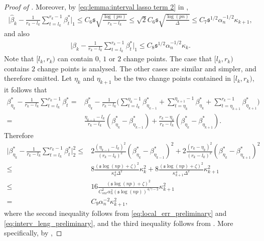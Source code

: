 \documentclass[11pt]{article}
\newcommand{\s}{ { \mathfrak{s}  } }
\theoremstyle{plain}
\theoremstyle{definition}
\begin{document}
\begin{proof}[Proof of ]
Moreover, by \eqref{eq:lemma:interval lasso term 2} in ,
\begin{align}\label{eq:lasso_err_preliminary_l1_1}
    \bigg| \widehat \beta_k - \frac{1}{r_k-l_k}\sum_{t = l_k}^{r_k-1}\beta_t^* \bigg|_1 \leq C_6\s\sqrt{\frac{\log(pn)}{r_k-l_k}} \leq \sqrt{2}C_6\s\sqrt{\frac{\log(pn)}{\Delta}} \leq C_7\s^{1/2}\alpha_n^{-1/2}\kappa_{k+1},
\end{align}
and also
\begin{align}\label{eq:lasso_err_preliminary_l1_3}
    \bigg| \widehat \beta_k - \frac{1}{r_k-l_k}\sum_{t = l_k}^{r_k-1}\beta_t^* \bigg|_1 \leq C_8\s^{1/2}\alpha_n^{-1/2}\kappa_{k}.
\end{align}
Note that $[l_k,r_k)$ can contain $0$, $1$ or $2$ change points. The case that $[l_k, r_k)$ contains $2$ change points is analysed. The other cases are similar and simpler, and therefore omitted. Let $\eta_{k}$ and $\eta_{k+1}$ be the two change points contained in $[l_k,r_k)$, it follows that
\begin{align*}
    \beta_{\eta_k}^* - \frac{1}{r_k-l_k}\sum_{t = l_k}^{r_k-1}\beta_t^* =&  \beta_{\eta_k}^* - \frac{1}{r_k-l_k}\bigg(\sum_{t = l_k}^{\eta_{k}-1}\beta_{\eta_{k-1}}^* + \sum_{t = \eta_{k}}^{\eta_{k+1}-1}\beta_{\eta_{k}}^* + \sum_{t = \eta_{k+1}}^{r_k-1}\beta_{\eta_{k+1}}^*\bigg)\\
    =& \frac{\eta_{k-1}-l_k}{r_k-l_k}(\beta_{\eta_{k}}^* - \beta_{\eta_{k-1}}^*) + \frac{r_k-\eta_k}{r_k-l_k}(\beta_{\eta_{k}}^* - \beta_{\eta_{k+1}}^*).
\end{align*}
Therefore
\begin{align}\label{eq:lasso_err_preliminary_2}
    \bigg|\beta_{\eta_k}^* - \frac{1}{r_k-l_k}\sum_{t = l_k}^{r_k-1}\beta_t^*\bigg|_2^2 
    \leq& 2\frac{(\eta_{k-1}-l_k)^2}{(r_k-l_k)^2}(\beta_{\eta_{k}}^* - \beta_{\eta_{k-1}}^*)^2 + 2\frac{(r_k - \eta_{k})^2}{(r_k-l_k)^2}(\beta_{\eta_{k}}^* - \beta_{\eta_{k+1}}^*)^2 \nonumber\\
    \leq& 8\frac{(\s \log(np) + \zeta)^2}{\kappa_{k}^4\Delta^2}\kappa_{k}^2 + 8\frac{(\s \log(np) + \zeta)^2}{\kappa_{k+1}^4\Delta^2}\kappa_{k+1}^2 \nonumber\\
    \leq& 16\frac{(\s \log(np) + \zeta)^2}{C_{snr}^2\alpha_n^2(\s\log( np))^{4/\gamma -2}}\kappa_{k+1}^2\nonumber\\
    =& C_9\alpha_n^{-2}\kappa_{k+1}^2,
\end{align}
where the second inequality follows from \eqref{eq:local_err_preliminary} and \eqref{eq:interv_leng_preliminary}, and the third inequality follows from . More specifically, by ,

\end{proof}
\end{document}
